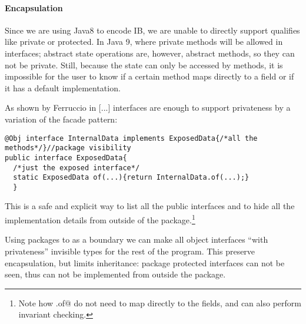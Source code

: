 \begin{comment}
@Obj interface Person$ extends Person{//will be further expanded by @Obj
  void name(String val);
  default void rename(String newName){ if(/*valid name*/){ this.name(val);}}
  String name();
  static Person from(String val){ if(/*valid name*/){return Person$.of(val);}
    throw /*invalid name*/}  }
\end{lstlisting}

This is not a perfect solution, since
\Q@Person$@ can still be seen inside the \Q@Person@ package and heirs of
\Q@Person$@,
however it is surprising we achieve such of a good result without any language
support for privacy in interfaces.
\end{comment}

\paragraph{Encapsulation} %
Since we are using Java8 to encode IB, we are unable to directly support qualifies
like private or protected. In Java 9, where private methods will be allowed in
interfaces; abstract state operations are, however, abstract methods,
so they can not be private.
Still, because the state can only be accessed by methods, it 
is impossible for the user to know if a certain method maps directly to a field
or if it has a default implementation. 

As shown by Ferruccio in [...] interfaces are enough to support privateness by a
 variation of the facade pattern:
\begin{lstlisting}
@Obj interface InternalData implements ExposedData{/*all the methods*/}//package visibility
public interface ExposedData{
  /*just the exposed interface*/
  static ExposedData of(...){return InternalData.of(...);}
  }
\end{lstlisting}

This is a safe and explicit way to list all the public interfaces and to hide all the implementation
details from outside of the package.\footnote{
Note how \Q@ExposedData.of@ do not need to map directly to the fields, and can also perform 
invariant checking.}

Using packages to as a boundary we can make all object interfaces ``with privateness''
invisible types for the rest of the program.
This preserve encapsulation, but limits inheritance:
package protected interfaces can not be seen,
thus can not be implemented from outside the package.

